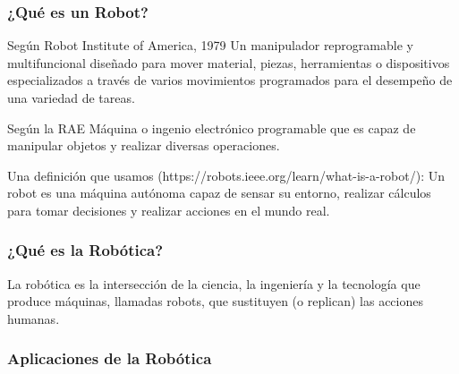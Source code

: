 \begin{frame}
    \frametitle{¿Qué es un Robot?}
    
    Según Robot Institute of America, 1979
    Un manipulador reprogramable y multifuncional diseñado para mover material, piezas, herramientas o dispositivos especializados a través de varios movimientos programados para el desempeño de una variedad de tareas.
    
    Según la RAE
    Máquina o ingenio electrónico programable que es capaz de manipular objetos y realizar diversas operaciones.
    
    Una definición que usamos (https://robots.ieee.org/learn/what-is-a-robot/):
    Un robot es una máquina autónoma capaz de sensar su entorno, realizar cálculos para tomar decisiones y realizar acciones en el mundo real.
    
    \note{}
\end{frame}

\begin{frame}
    \frametitle{¿Qué es la Robótica?}
    La robótica es la intersección de la ciencia, la ingeniería y la tecnología que produce máquinas, llamadas robots, que sustituyen (o replican) las acciones humanas.
\end{frame}

\begin{frame}
    \frametitle{Aplicaciones de la Robótica}
    
    
\end{frame}

